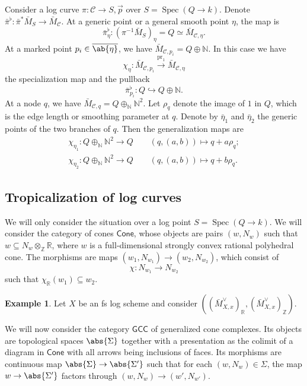 \documentclass{amsart}
\theoremstyle{definition}
\newtheorem{exm}[thm]{Example}
\theoremstyle{remark}
\theoremstyle{plain}
\theoremstyle{definition}
\theoremstyle{remark}
\newcommand{\N}{\mathbb{N}}
\newcommand{\R}{\mathbb{R}}
\newcommand{\Z}{\mathbb{Z}}
\newcommand{\mc}[1]{\mathcal{#1}}
\newcommand{\on}[1]{\operatorname{#1}}
\newcommand{\ms}[1]{\mathsf{#1}}
\newcommand{\ol}[1]{\overline{#1}}
\newcommand{\1}{\mathbf{1}}
\newcommand{\2}{\mathbf{2}}
\newcommand{\3}{\mathbf{3}}
\DeclareMathOperator{\Spec}{Spec}
\begin{document}
Consider a log curve \(\pi \colon \mc{C} \to S, \vec{p}\) over \(S = \Spec (Q \to k)\). Denote \(\bar{\pi}^{\flat} \colon \bar{\pi}^* \bar{M}_S \to \bar{M}_{\mc{C}}\). At a generic point or a general smooth point \(\eta\), the map is
\[ \bar{\pi}_{\eta}^{\flat} \colon (\pi^{-1} \bar{M}_S)_{\eta} = Q \simeq \bar{M}_{\mc{C}, \eta}. \]
At a marked point \(p_i \in \ol{\ab\{\eta\}}\), we have \(\bar{M}_{\mc{C}, p_i} = Q \oplus \N\). In this case we have
\[ \chi_{\eta} \colon \bar{M}_{\mc{C}, p_i} \xrightarrow{\on{pr}_1} \bar{M}_{\mc{C}, \eta} \]
the specialization map and the pullback
\[ \bar{\pi}_{p_i}^{\flat} \colon Q \hookrightarrow Q \oplus \N. \]
At a node \(q\), we have \(\bar{M}_{\mc{C}, q} = Q \oplus_{\N} \N^2\). Let \(\rho_q\) denote the image of \(1\) in \(Q\), which is the edge length or smoothing parameter at \(q\). Denote by \(\bar{\eta}_1\) and \(\bar{\eta}_2\) the generic points of the two branches of \(q\). Then the generalization maps are
\begin{align*}
    \chi_{\eta_1} \colon Q \oplus_{\N} \N^2 \to Q \qquad (q, (a,b)) \mapsto q + a \rho_q ;\\
    \chi_{\eta_2} \colon Q \oplus_{\N} \N^2 \to Q \qquad (q, (a,b)) \mapsto q + b \rho_q .
\end{align*}

\subsection{Tropicalization of log curves}%
\label{sub:Tropicalization of log curves}

We will only consider the situation over a log point \(S = \Spec(Q \to k)\). We will consider the category of cones \(\ms{Cone}\), whose objects are pairs \((w, N_w)\) such that \(w \subseteq N_w \otimes_{\Z} \R\), where \(w\) is a full-dimensional strongly convex rational polyhedral cone. The morphisms are maps \((w_1, N_{w_1}) \to (w_2, N_{w_2})\), which consist of
\[ \chi \colon N_{w_1} \to N_{w_2} \]
such that \(\chi_{\R}(w_1) \subseteq w_2\). 

\begin{exm}
    Let \(X\) be an fs log scheme and consider \(( (\bar{M}_{X,x}^{\vee})_{\R}, (\bar{M}_{X,x}^{\vee})_{\Z} )\).
\end{exm}

We will now consider the category \(\ms{GCC}\) of generalized cone complexes. Its objects are topological spaces \(\abs{\Sigma}\) together with a presentation as the colimit of a diagram in \(\ms{Cone}\) with all arrows being inclusions of faces. Its morphisms are continuous map \(\abs{\Sigma} \to \abs{\Sigma'}\) such that for each \((w, N_w) \in \Sigma\), the map \(w \to \abs{\Sigma'}\) factors through \((w, N_w) \to (w', N_{w'})\).
\end{document}
